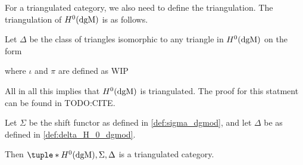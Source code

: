 For a triangulated category, we also need to define the triangulation. The triangulation of \( H^0(\operatorname{dgM}) \) is as follows.
\begin{definition}
    \label{def:delta_H_0_dgmod}
    Let \( \Delta \) be the class of triangles isomorphic to any triangle in \( H^0(\operatorname{dgM}) \) on the form
    \begin{center}
    \end{center}
    where \( \iota \) and \( \pi \) are defined as WIP
\end{definition}

All in all this implies that \( H^0(\operatorname{dgM}) \) is triangulated. The proof for this statment can be found in TODO:CITE.
\begin{theorem}
    Let \( \Sigma \) be the shift functor as defined in \autoref{def:sigma_dgmod}, and let \( \Delta \) be as defined in \autoref{def:delta_H_0_dgmod}.

    Then \( \tuple*{H^0(\dgM), \Sigma, \Delta} \) is a triangulated category.
\end{theorem}





    

